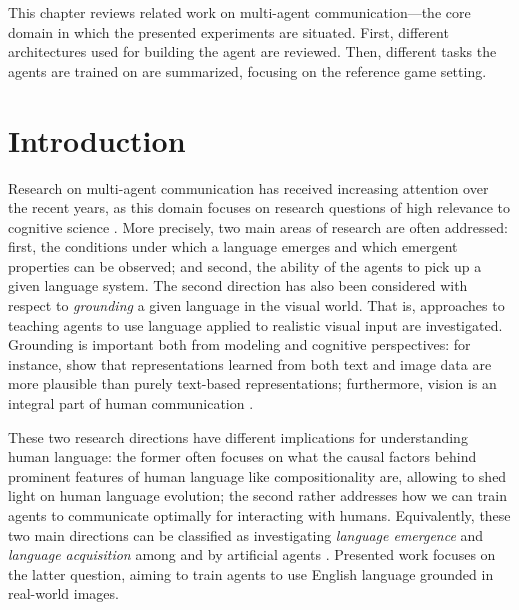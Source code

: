 
This chapter reviews related work on multi-agent communication---the core domain in which the presented experiments are situated. First, different architectures used for building the agent are reviewed. Then, different tasks the agents are trained on are summarized, focusing on the reference game setting. 


\section{Introduction}
Research on multi-agent communication has received increasing attention over the recent years, as this domain focuses on research questions of high relevance to cognitive science \parencite{lazaridou2020emergent}. More precisely, two main areas of research are often addressed: first, the conditions under which a language emerges and which emergent properties can be observed; and second, the ability of the agents to pick up a given language system. %
The second direction has also been considered with respect to \textit{grounding} a given language in the visual world. That is, approaches to teaching agents to use language applied to realistic visual input are investigated. Grounding is important both from modeling and cognitive perspectives: for instance, \cite{bruni2014multimodal} show that representations learned from both text and image data are more plausible than purely text-based representations; furthermore, vision is an integral part of human communication \parencite{tomasello2010origins, harnad1990symbol}. 

These two research directions have different implications for understanding human language: the former often focuses on what the causal factors behind prominent features of human language like compositionality are, allowing to shed light on human language evolution; the second rather addresses how we can train agents to communicate optimally for interacting with humans. Equivalently, these two main directions can be classified as investigating \textit{language emergence} and \textit{language acquisition} among and by artificial agents \parencite{lazaridou2018emergence, lazaridou2020emergent}.
Presented work focuses on the latter question, aiming to train agents to use English language grounded in real-world images.

